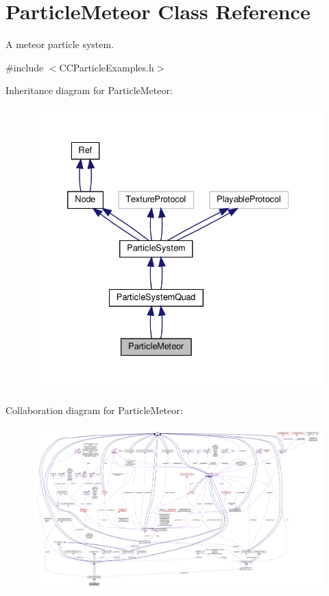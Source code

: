 \hypertarget{classParticleMeteor}{}\section{Particle\+Meteor Class Reference}
\label{classParticleMeteor}


A meteor particle system.  




{\ttfamily \#include $<$C\+C\+Particle\+Examples.\+h$>$}



Inheritance diagram for Particle\+Meteor\+:
\nopagebreak
\begin{figure}[H]
\begin{center}
\leavevmode
\includegraphics[width=332pt]{classParticleMeteor__inherit__graph}
\end{center}
\end{figure}


Collaboration diagram for Particle\+Meteor\+:
\nopagebreak
\begin{figure}[H]
\begin{center}
\leavevmode
\includegraphics[width=350pt]{classParticleMeteor__coll__graph}
\end{center}
\end{figure}
